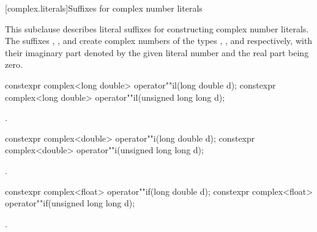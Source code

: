 [complex.literals]{Suffixes for complex number literals}

%
\pnum
This subclause describes literal suffixes for constructing complex number literals.
The suffixes , , and  create complex numbers of
the types , , and
 respectively, with their imaginary part denoted by the
given literal number and the real part being zero.

%
\begin{itemdecl}
constexpr complex<long double> operator""il(long double d);
constexpr complex<long double> operator""il(unsigned long long d);
\end{itemdecl}

\begin{itemdescr}
\pnum
\returns
{}.
\end{itemdescr}

%
\begin{itemdecl}
constexpr complex<double> operator""i(long double d);
constexpr complex<double> operator""i(unsigned long long d);
\end{itemdecl}

\begin{itemdescr}
\pnum
\returns
{}.
\end{itemdescr}

%
\begin{itemdecl}
constexpr complex<float> operator""if(long double d);
constexpr complex<float> operator""if(unsigned long long d);
\end{itemdecl}

\begin{itemdescr}
\pnum
\returns
{}.
\end{itemdescr}



